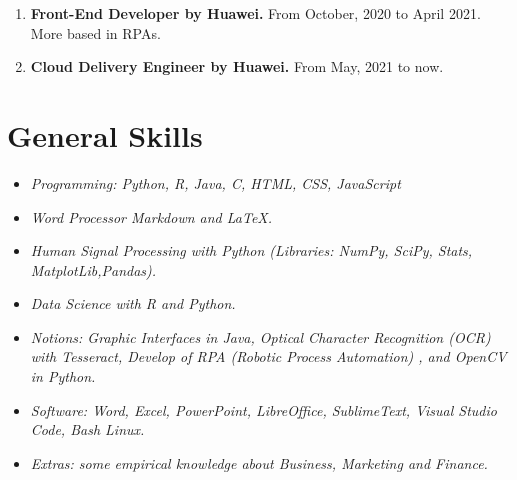 \documentclass[]{friggeri-cv}
\begin{document}
\begin{enumerate}
    \item \textbf{Front-End Developer by Huawei.} From October, 2020 to April 2021. More based in RPAs.
    \item \textbf{Cloud Delivery Engineer by Huawei.} From May, 2021 to now.
\end{enumerate}


\section{General Skills}

\begin{itemize}

    \item \emph{Programming: Python, R, Java, C, HTML, CSS, JavaScript}
    
    \item \emph{Word Processor Markdown and \LaTeX.}
    
    \item \emph{Human Signal Processing with Python (Libraries: NumPy, SciPy, Stats, MatplotLib,Pandas).}
    
    \item \emph{Data Science with R and Python.}
    
    \item \emph{Notions: Graphic Interfaces in Java, Optical Character Recognition (OCR) with Tesseract, Develop of RPA (Robotic Process Automation) , and OpenCV in Python.}
    
    
    
    \item \emph{Software: Word, Excel, PowerPoint, LibreOffice, SublimeText, Visual Studio Code, Bash Linux.}
    
    \item \emph{Extras: some empirical knowledge about Business, Marketing and  Finance.}
    

\end{itemize}
\end{document}
